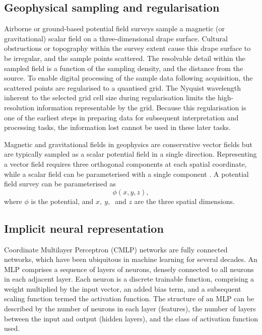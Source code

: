 \subsection{Geophysical sampling and regularisation}
\label{sec:geo_airborne}
Airborne or ground-based potential field surveys sample a magnetic (or gravitational) scalar field on a three-dimensional drape surface.
Cultural obstructions or topography within the survey extent cause this drape surface to be irregular, and the sample points scattered.
The resolvable detail within the sampled field is a function of the sampling density, and the distance from the source.
To enable digital processing of the sample data following acquisition, the scattered points are regularised to a quantised grid.
The Nyquist wavelength inherent to the selected grid cell size during regularisation limits the high-resolution information representable by the grid.
Because this regularisation is one of the earliest steps in preparing data for subsequent interpretation and processing tasks, the information lost cannot be used in these later tasks.

Magnetic and gravitational fields in geophysics are conservative vector fields but are typically sampled as a scalar potential field in a single direction.
Representing a vector field requires three orthogonal components at each spatial coordinate, while a scalar field can be parameterised with a single component \parencite{blakelyPotentialTheoryGravity1996}.
A potential field survey can be parameterised as
\begin{equation}
    \label{eqn:potential}
    \phi\left(x, y, z\right),
\end{equation}
where \(\phi{}\) is the potential, and \(x,\ y,\ \) and \(z\) are the three spatial dimensions.

\subsection{Implicit neural representation}
\label{sec:inr}
Coordinate Multilayer Perceptron (CMLP) networks are fully connected networks, which have been ubiquitous in machine learning for several decades.
An MLP comprises a sequence of layers of neurons, densely connected to all neurons in each adjacent layer.
Each neuron is a discrete trainable function, comprising a weight multiplied by the input vector, an added bias term, and a subsequent scaling function termed the activation function.
The structure of an MLP can be described by the number of neurons in each layer (features), the number of layers between the input and output (hidden layers), and the class of activation function used.

